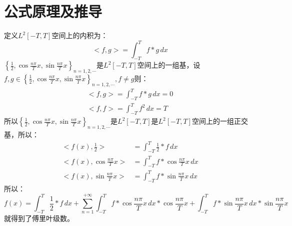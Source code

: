 \documentclass[12pt,a4paper]{article}
\begin{document}
\section{公式原理及推导}
定义$L^2[-T,T]$空间上的内积为：
$$
<f,g>=\int_{-T}^{T}f*g\,dx
$$
$\left\{\frac{1}{2},\cos{\frac{n\pi}{T}x},\sin{\frac{n\pi}{T}x}\right\}_{n=1,2,\cdots}$是$L^2[-T,T]$空间上的一组基，设$f,g\in\left\{\frac{1}{2},\cos{\frac{n\pi}{T}x},\sin{\frac{n\pi}{T}x}\right\}_{n=1,2,\cdots},f\neq g$则：
\begin{align*}
<f,g>=\int_{-T}^{T}f*g\,dx=0\\
<f,f>=\int_{-T}^{T}f^2\,dx=T
\end{align*}
所以$\left\{\frac{1}{2},\cos{\frac{n\pi}{T}x},\sin{\frac{n\pi}{T}x}\right\}_{n=1,2,\cdots}$是$L^2[-T,T]$是$L^2[-T,T]$空间上的一组正交基，所以：
\begin{align*}
<f(x),\frac{1}{2}>&=\int_{-T}^{T}{\frac{1}{2}*f}\,dx\\
<f(x),\cos{\frac{n\pi}{T}x}>&=\int_{-T}^{T}{f*\cos{\frac{n\pi}{T}x}}\,dx\\
<f(x),\sin{\frac{n\pi}{T}x}>&=\int_{-T}^{T}{f*\sin{\frac{n\pi}{T}x}}\,dx
\end{align*}
所以：
$$
f(x)=\int_{-T}^{T}{\frac{1}{2}*f}\,dx+\sum_{n=1}^{+\infty}{\int_{-T}^{T}{f*\cos{\frac{n\pi}{T}x}}\,dx*\cos{\frac{n\pi}{T}x}+\int_{-T}^{T}{f*\sin{\frac{n\pi}{T}x}}\,dx*\sin{\frac{n\pi}{T}x}}
$$
就得到了傅里叶级数。










































\cite{tam19912d}

\end{document}
